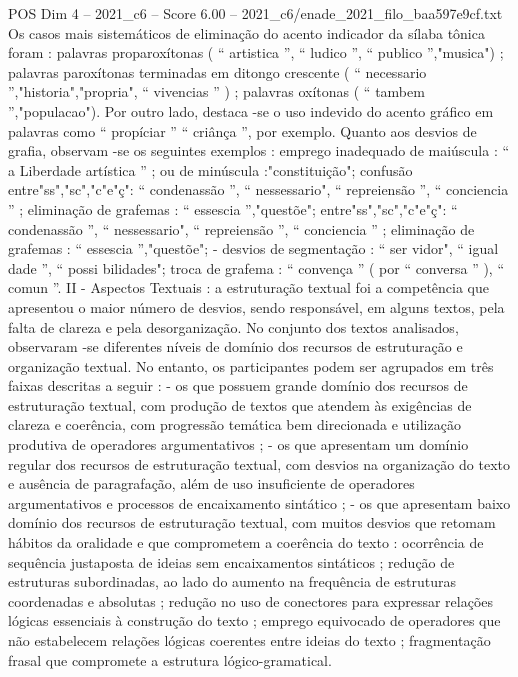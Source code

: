 \begin{textsample}{POS Dim 4 – 2021\_c6 – Score 6.00 – 2021\_c6/enade\_2021\_filo\_baa597e9cf.txt}
Os casos mais sistemáticos de eliminação do acento indicador da sílaba tônica foram : palavras proparoxítonas ( “ artistica ”, “ ludico ”, “ publico ”,"musica") ; palavras paroxítonas terminadas em ditongo crescente ( “ necessario ”,"historia","propria", “ vivencias ” ) ; palavras oxítonas ( “ tambem ”,"populacao").
Por outro lado, destaca -se o uso indevido do acento gráfico em palavras como “ propíciar ” “ criânça ”, por exemplo.
Quanto aos desvios de grafia, observam -se os seguintes exemplos : emprego inadequado de maiúscula : “ a Liberdade artística ” ; ou de minúscula :"constituição"; confusão entre"ss","sc","c"e"ç": “ condenassão ”, “ nessessario", “ repreiensão ”, “ conciencia ” ; eliminação de grafemas : “ essescia ”,"questõe"; entre"ss","sc","c"e"ç": “ condenassão ”, “ nessessario", “ repreiensão ”, “ conciencia ” ; eliminação de grafemas : “ essescia ”,"questõe"; - desvios de segmentação : “ ser vidor", “ igual dade ”, “ possi bilidades"; troca de grafema : “ convença ” ( por “ conversa ” ), “ comun ”.
II - Aspectos Textuais : a estruturação textual foi a competência que apresentou o maior número de desvios, sendo responsável, em alguns textos, pela falta de clareza e pela desorganização.
No conjunto dos textos analisados, observaram -se diferentes níveis de domínio dos recursos de estruturação e organização textual.
No entanto, os participantes podem ser agrupados em três faixas descritas a seguir : - os que possuem grande domínio dos recursos de estruturação textual, com produção de textos que atendem às exigências de clareza e coerência, com progressão temática bem direcionada e utilização produtiva de operadores argumentativos ; - os que apresentam um domínio regular dos recursos de estruturação textual, com desvios na organização do texto e ausência de paragrafação, além de uso insuficiente de operadores argumentativos e processos de encaixamento sintático ; - os que apresentam baixo domínio dos recursos de estruturação textual, com muitos desvios que retomam hábitos da oralidade e que comprometem a coerência do texto : ocorrência de sequência justaposta de ideias sem encaixamentos sintáticos ; redução de estruturas subordinadas, ao lado do aumento na frequência de estruturas coordenadas e absolutas ; redução no uso de conectores para expressar relações lógicas essenciais à construção do texto ; emprego equivocado de operadores que não estabelecem relações lógicas coerentes entre ideias do texto ; fragmentação frasal que compromete a estrutura lógico-gramatical.

\end{textsample}
